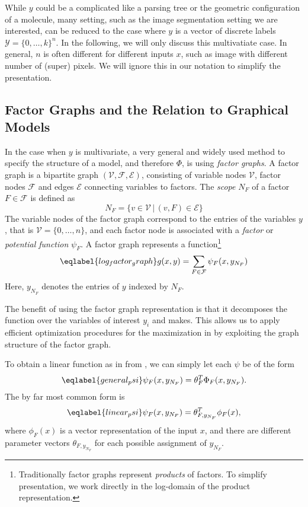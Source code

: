 While $y$ could be a complicated like a parsing tree or the geometric configuration of a molecule,
many setting, such as the image segmentation setting we are interested, can be reduced to the case
where $y$ is a vector of discrete labels $\mathcal{Y} = \{0, \dotsc, k\}^n$. %
In the following, we will only discuss this multivatiate case. In general, $n$ is often different
for different inputs $x$, such as image with different number of (super) pixels.
We will ignore this in our notation to simplify the presentation.

\subsection{Factor Graphs and the Relation to Graphical Models}
In the case when $y$ is multivariate, a very general and widely used method to
specify the structure of a model, and therefore $\Phi$, is using \emph{factor
graphs}. A factor graph is a bipartite graph $(\mathcal{V}, \mathcal{F},
\mathcal{E})$, consisting of variable nodes $\mathcal{V}$, factor nodes
$\mathcal{F}$ and edges $\mathcal{E}$ connecting variables to factors. The
\emph{scope} $N_F$ of a factor $F \in \mathcal{F}$ is defined as
\begin{equation}
    N_F = \{ v \in \mathcal{V} \,|\, (v,F) \in \mathcal{E} \}
\end{equation}
The variable nodes of the factor graph correspond to the entries of the variables $y$,
that is $\mathcal{V} = \{0, \dotsc, n\}$, and each factor node is associated with a \emph{factor} or \emph{potential function}
$\psi_F$.
A factor graph represents a function\footnote{Traditionally factor graphs represent \emph{products} of factors.
To simplify presentation, we work directly in the log-domain of the product representation.}
\begin{equation}\eqlabel{log_factor_graph}
    g(x, y) = \sum_{F \in \mathcal{F}} \psi_F(x, y_{N_F})
\end{equation}
Here, $y_{N_F}$ denotes the entries of $y$ indexed by $N_F$.

The benefit of using the factor graph representation is that it decomposes the
function over the variables of interest $y_i$ and makes. This allows us to
apply efficient optimization procedures for the maximization in
 by exploiting the graph structure of the factor graph.

To obtain a linear function as in  from
, we can simply let each $\psi$ be of the form
\begin{equation}\eqlabel{general_psi}
    \psi_F(x, y_{N_F}) = \theta_F^T \Phi_F(x, y_{N_F}).
\end{equation}
The by far most common form is 
\begin{equation}\eqlabel{linear_psi}
    \psi_F(x, y_{N_F}) = \theta_{F, y_{N_F}}^T \phi_F(x),
\end{equation}
where $\phi_F(x)$ is a vector representation of the input $x$, and there are
different parameter vectors $\theta_{F, y_{N_F}}$ for each possible assignment
of $y_{N_F}$.

